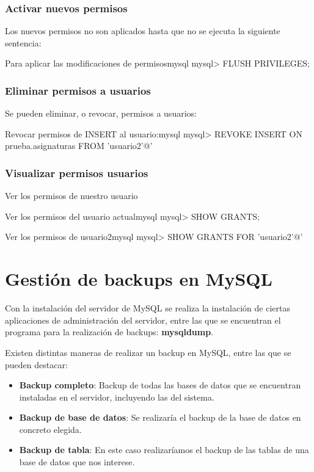 \subsection{Activar nuevos permisos}
Los nuevos permisos no son aplicados hasta que no se ejecuta la siguiente sentencia:

\begin{mycode}{Para aplicar las modificaciones de permisos}{mysql}{}
mysql> FLUSH PRIVILEGES;
\end{mycode}


\subsection{Eliminar permisos a usuarios}
Se pueden eliminar, o revocar, permisos a usuarios:

\begin{mycode}{Revocar permisos de INSERT al usuario:}{mysql}{}
mysql> REVOKE INSERT ON prueba.asignaturas FROM 'usuario2'@'%
\end{mycode}


\subsection{Visualizar permisos usuarios}
Ver los permisos de nuestro usuario

\begin{mycode}{Ver los permisos del usuario actual}{mysql}{}
mysql> SHOW GRANTS;
\end{mycode}


\begin{mycode}{Ver los permisos de usuario2}{mysql}{}
mysql> SHOW GRANTS FOR 'usuario2'@'%
\end{mycode}


\chapter{Gestión de backups en MySQL}

Con la instalación del servidor de MySQL se realiza la instalación de ciertas aplicaciones de administración del servidor, entre las que se encuentran el programa para la realización de backups: \textbf{mysqldump}.

Existen distintas maneras de realizar un backup en MySQL, entre las que se pueden destacar:

\begin{itemize}
    \item \textbf{Backup completo}: Backup de todas las bases de datos que se encuentran instaladas en el servidor, incluyendo las del sistema.
    \item \textbf{Backup de base de datos}: Se realizaría el backup de la base de datos en concreto elegida.
    \item \textbf{Backup de tabla}: En este caso realizaríamos el backup de las tablas de una base de datos que nos interese.
\end{itemize}

